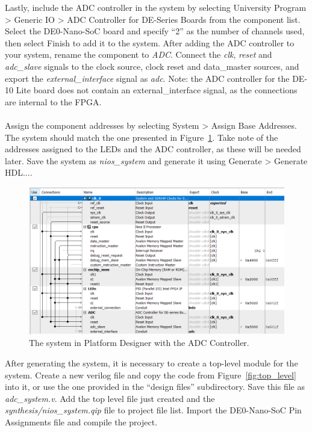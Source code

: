\documentclass[11pt, twoside, pdftex]{article}
\begin{document}
Lastly, include the ADC controller in the system by selecting {\sf University Program > Generic IO > ADC Controller for DE-Series Boards} from the component list. Select the DE0-Nano-SoC board and specify ``2'' as the number of channels used, then select {\sf Finish} to add it to the system. After adding the ADC controller to your system, rename the component to {\it ADC}. Connect the {\it clk}, {\it reset} and {\it adc\_slave} signals to the clock source, clock reset and data\_master sources, and export the {\it external\_interface} signal as {\it adc}. Note: the ADC controller for the DE-10 Lite board does not contain an external\_interface signal, as the connections are internal to the FPGA. \\
\\
Assign the component addresses by selecting {\sf System > Assign Base Addresses}. The system should match the one presented in Figure~\ref{fig:qsys_adc}. Take note of the addresses assigned to the LEDs and the ADC controller, as these will be needed later. Save the system as {\it nios\_system} and generate it using {\sf Generate > Generate HDL...}.


\begin {figure} [H]
\begin {center}
\includegraphics [scale = 0.7] {figures/qsys_adc.png}
\end{center}
\caption {The system in Platform Designer with the ADC Controller.}
\label {fig:qsys_adc}
\end{figure}

After generating the system, it is necessary to create a top-level module for the system. Create a new verilog file and copy the code from Figure~\ref{fig:top_level} into it, or use the one provided in the ``design files'' subdirectory. Save this file as {\it adc\_system.v}. Add the top level file just created and the {\it synthesis/nios\_system.qip} file to project file list. Import the DE0-Nano-SoC Pin Assignments file and compile the project.
\end{document}
